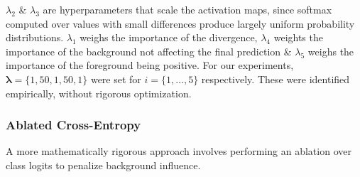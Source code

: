 \documentclass{article}
\theoremstyle{plain}
\theoremstyle{definition}
\theoremstyle{remark}
\begin{document}
$\lambda_2$ \& $\lambda_3$ are hyperparameters that scale the activation maps, since softmax computed over values with small differences produce largely uniform probability distributions. $\lambda_1$ weighs the importance of the divergence, $\lambda_4$ weights the importance of the background not affecting the final prediction \& $\lambda_5$ weighs the importance of the foreground being positive. For our experiments, $\bm{\lambda} = \{1, 50, 1, 50, 1\}$ were set for $i = \{1, \ldots, 5\}$ respectively. These were identified empirically, without rigorous optimization.

\subsubsection{Ablated Cross-Entropy}

A more mathematically rigorous approach involves performing an ablation over class logits to penalize background influence.
\end{document}
